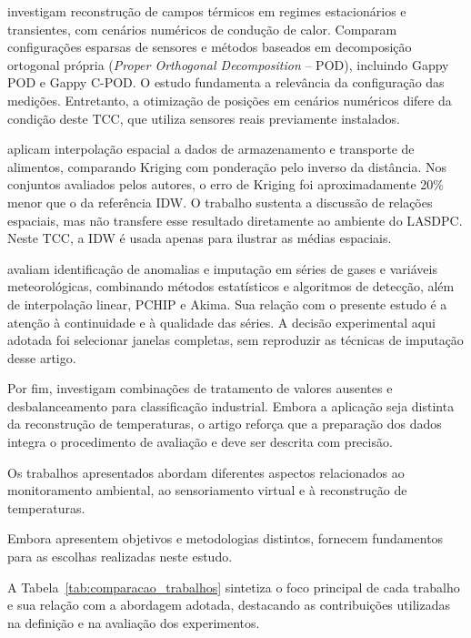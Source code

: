  investigam reconstrução de campos
térmicos em regimes estacionários e transientes, com cenários numéricos
de condução de calor. Comparam configurações esparsas de sensores e
métodos baseados em decomposição ortogonal própria (\textit{Proper
Orthogonal Decomposition} -- POD), incluindo Gappy POD e Gappy C-POD.
O estudo fundamenta a relevância da configuração das medições. Entretanto,
a otimização de posições em cenários numéricos difere da condição deste
TCC, que utiliza sensores reais previamente instalados.

 aplicam interpolação espacial
a dados de armazenamento e transporte de alimentos, comparando Kriging
com ponderação pelo inverso da distância. Nos conjuntos avaliados pelos
autores, o erro de Kriging foi aproximadamente 20\% menor que o da
referência IDW. O trabalho sustenta a discussão de relações espaciais,
mas não transfere esse resultado diretamente ao ambiente do LASDPC.
Neste TCC, a IDW é usada apenas para ilustrar as médias espaciais.

 avaliam identificação de anomalias e
imputação em séries de gases e variáveis meteorológicas, combinando
métodos estatísticos e algoritmos de detecção, além de interpolação
linear, PCHIP e Akima. Sua relação com o presente estudo é a atenção
à continuidade e à qualidade das séries. A decisão experimental aqui
adotada foi selecionar janelas completas, sem reproduzir as técnicas
de imputação desse artigo.

Por fim,  investigam combinações de
tratamento de valores ausentes e desbalanceamento para classificação
industrial. Embora a aplicação seja distinta da reconstrução de
temperaturas, o artigo reforça que a preparação dos dados integra
o procedimento de avaliação e deve ser descrita com precisão.

Os trabalhos apresentados abordam diferentes aspectos
relacionados ao monitoramento ambiental, ao sensoriamento
virtual e à reconstrução de temperaturas.

Embora apresentem objetivos e metodologias distintos,
fornecem fundamentos para as escolhas realizadas neste
estudo.

A Tabela~\ref{tab:comparacao_trabalhos} sintetiza
o foco principal de cada trabalho e sua relação com
a abordagem adotada, destacando as contribuições
utilizadas na definição e na avaliação dos experimentos.

